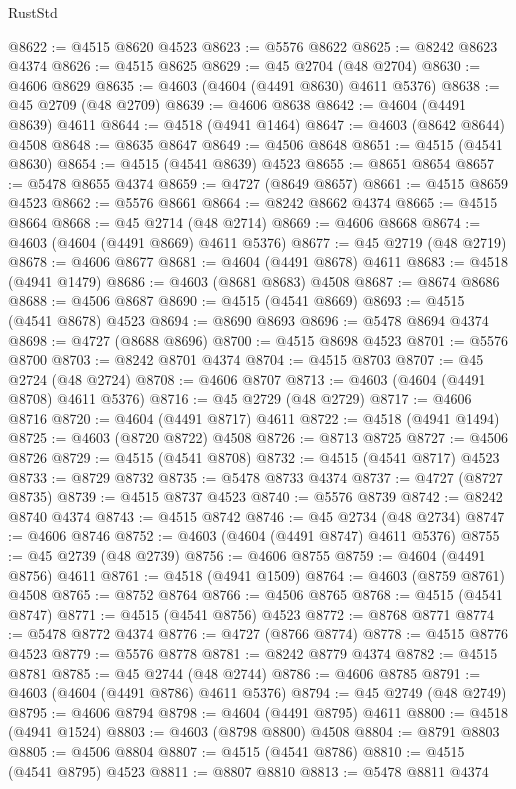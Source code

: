 \begin{lexlean}{RustStd}
\begin{coremodule}
@8622 := @4515 @8620 @4523
@8623 := @5576 @8622
@8625 := @8242 @8623 @4374
@8626 := @4515 @8625
@8629 := @45 @2704 (@48 @2704)
@8630 := @4606 @8629
@8635 := @4603 (@4604 (@4491 @8630) @4611 @5376)
@8638 := @45 @2709 (@48 @2709)
@8639 := @4606 @8638
@8642 := @4604 (@4491 @8639) @4611
@8644 := @4518 (@4941 @1464)
@8647 := @4603 (@8642 @8644) @4508
@8648 := @8635 @8647
@8649 := @4506 @8648
@8651 := @4515 (@4541 @8630)
@8654 := @4515 (@4541 @8639) @4523
@8655 := @8651 @8654
@8657 := @5478 @8655 @4374
@8659 := @4727 (@8649 @8657)
@8661 := @4515 @8659 @4523
@8662 := @5576 @8661
@8664 := @8242 @8662 @4374
@8665 := @4515 @8664
@8668 := @45 @2714 (@48 @2714)
@8669 := @4606 @8668
@8674 := @4603 (@4604 (@4491 @8669) @4611 @5376)
@8677 := @45 @2719 (@48 @2719)
@8678 := @4606 @8677
@8681 := @4604 (@4491 @8678) @4611
@8683 := @4518 (@4941 @1479)
@8686 := @4603 (@8681 @8683) @4508
@8687 := @8674 @8686
@8688 := @4506 @8687
@8690 := @4515 (@4541 @8669)
@8693 := @4515 (@4541 @8678) @4523
@8694 := @8690 @8693
@8696 := @5478 @8694 @4374
@8698 := @4727 (@8688 @8696)
@8700 := @4515 @8698 @4523
@8701 := @5576 @8700
@8703 := @8242 @8701 @4374
@8704 := @4515 @8703
@8707 := @45 @2724 (@48 @2724)
@8708 := @4606 @8707
@8713 := @4603 (@4604 (@4491 @8708) @4611 @5376)
@8716 := @45 @2729 (@48 @2729)
@8717 := @4606 @8716
@8720 := @4604 (@4491 @8717) @4611
@8722 := @4518 (@4941 @1494)
@8725 := @4603 (@8720 @8722) @4508
@8726 := @8713 @8725
@8727 := @4506 @8726
@8729 := @4515 (@4541 @8708)
@8732 := @4515 (@4541 @8717) @4523
@8733 := @8729 @8732
@8735 := @5478 @8733 @4374
@8737 := @4727 (@8727 @8735)
@8739 := @4515 @8737 @4523
@8740 := @5576 @8739
@8742 := @8242 @8740 @4374
@8743 := @4515 @8742
@8746 := @45 @2734 (@48 @2734)
@8747 := @4606 @8746
@8752 := @4603 (@4604 (@4491 @8747) @4611 @5376)
@8755 := @45 @2739 (@48 @2739)
@8756 := @4606 @8755
@8759 := @4604 (@4491 @8756) @4611
@8761 := @4518 (@4941 @1509)
@8764 := @4603 (@8759 @8761) @4508
@8765 := @8752 @8764
@8766 := @4506 @8765
@8768 := @4515 (@4541 @8747)
@8771 := @4515 (@4541 @8756) @4523
@8772 := @8768 @8771
@8774 := @5478 @8772 @4374
@8776 := @4727 (@8766 @8774)
@8778 := @4515 @8776 @4523
@8779 := @5576 @8778
@8781 := @8242 @8779 @4374
@8782 := @4515 @8781
@8785 := @45 @2744 (@48 @2744)
@8786 := @4606 @8785
@8791 := @4603 (@4604 (@4491 @8786) @4611 @5376)
@8794 := @45 @2749 (@48 @2749)
@8795 := @4606 @8794
@8798 := @4604 (@4491 @8795) @4611
@8800 := @4518 (@4941 @1524)
@8803 := @4603 (@8798 @8800) @4508
@8804 := @8791 @8803
@8805 := @4506 @8804
@8807 := @4515 (@4541 @8786)
@8810 := @4515 (@4541 @8795) @4523
@8811 := @8807 @8810
@8813 := @5478 @8811 @4374

\end{coremodule}
\end{lexlean}
